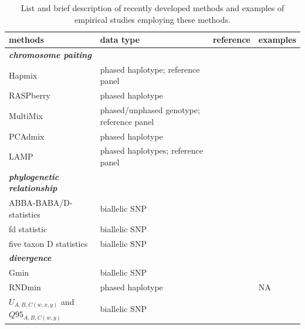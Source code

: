 \documentclass[11pt]{article}
\begin{document}
	
	



\begin{table}

\begin{center}
\caption{List and brief description of recently developed methods and examples of empirical studies employing these methods.} \label{tab:tools}
\begin{tabularx}{\textwidth}{llll}
\\\toprule  
\rowcolor{white}
{\bf methods}	& {\bf data type } &	{\bf reference} &  {\bf examples } \\ \midrule

\rowcolor{gray!25}
{\emph{\bf chromosome paiting}} &   &   &   \\
\rowcolor{gray!25}
Hapmix	& phased haplotype; reference panel		& \cite{Price2009}	&  \cite{Hufford2013, suarez2016} \\ 
\rowcolor{gray!25}
RASPberry &	phased haplotype &	\cite{wegmann2011}	 & \cite{christe2016} \\
\rowcolor{gray!25}
MultiMix & phased/unphased genotype; reference panel &	\cite{churchhouse2013} &	\cite{eyheramendy2015} \\
\rowcolor{gray!25}
PCAdmix	 & phased haplotype	 & \cite{brisbin2012pcadmix}	 &  \cite{pugach2016complex, moreno2014genetics} \\
\rowcolor{gray!25}
LAMP  &	phased haplotypes; reference panel	 & \cite{sankararaman2008}	 & \cite{patterson2012} \\

\rowcolor{white}
{\emph{\bf phylogenetic relationship}} &   &   &   \\
\rowcolor{white}
ABBA-BABA/D-statistics	 & biallelic SNP  &	\cite{durand2011}	 &  \cite{heliconius2012} \\
\rowcolor{white}
fd statistic &	biallelic SNP &	\cite{martin2015}  &	\cite{malinsky2015, zhang2016genome} \\ 
\rowcolor{white}
five taxon D statistics	& biallelic SNP	&  \cite{pease2015}	& \cite{fontaine2015, pease2016} \\

\rowcolor{gray!25}
{\emph{\bf divergence}} &   &   &   \\
\rowcolor{gray!25}
Gmin &	biallelic SNP	&  \cite{geneva2015}	 &  \cite{kingan2015}\\
\rowcolor{gray!25}
RNDmin	& phased haplotype	& \cite{rosenzweig2016} &  NA \\
\rowcolor{gray!25}
$U_{A,B,C(w,x,y)}$ and $Q95_{A,B,C(w,y)}$ & biallelic SNP & \cite{Racimo2015} & \cite{sams2016} \\

\end{tabularx}
\end{center}
\end{table} 
\end{document}
